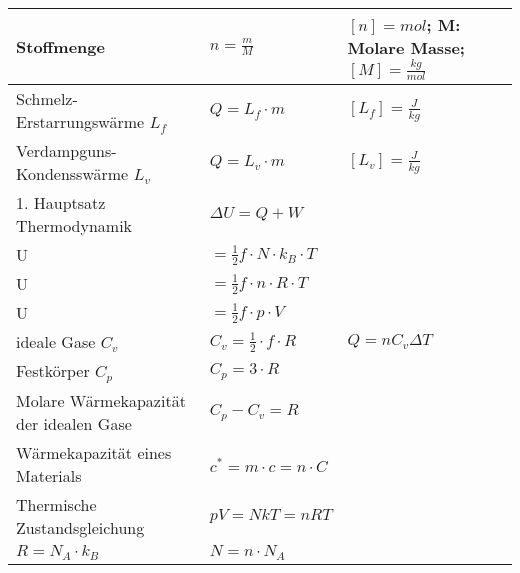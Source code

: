 \begin{tabularx}{\columnwidth}{@{}XXX@{}}
	Stoffmenge                             & $n = \frac{m}{M}$                                    & $[n] = mol$; M: Molare Masse; $[M] = \frac{kg}{mol}$ \\ \hline
	Schmelz-Erstarrungswärme $L_f$         & $Q = L_f\cdot m$                                     & $[L_f] = \frac{J}{kg}$                               \\ \hline
	Verdampguns-Kondensswärme $L_v$        & $Q = L_v\cdot m$                                     & $[L_v] = \frac{J}{kg}$                               \\ \hline
	1. Hauptsatz Thermodynamik             & $\Delta U = Q + W$                                                                                          \\ \hline
	U                                      & $= \frac{1}{2}f\cdot N\cdot k_B \cdot T$                                                                    \\ \hline
	U                                      & $= \frac{1}{2}f\cdot n\cdot R \cdot T$                                                                      \\ \hline
	U                                      & $= \frac{1}{2}f\cdot p \cdot V$                                                                             \\ \hline
	ideale Gase $C_v$                      & $C_v = \frac{1}{2}\cdot f \cdot R$                   & $Q = nC_v\Delta T$                                   \\ \hline
	Festkörper $C_p$                       & $C_p = 3\cdot R$                                                                                            \\ \hline
	Molare Wärmekapazität der idealen Gase & $C_p - C_v = R$                                                                                             \\ \hline
	Wärmekapazität eines Materials         & $c^{*} = m \cdot c = n \cdot C$                                                                             \\ \hline
	Thermische Zustandsgleichung           & $pV = NkT = nRT$                                                                                            \\ \hline
	$R = N_A \cdot k_B $                   & $N = n \cdot N_A$                                                                                           \\ \hline

\end{tabularx}
